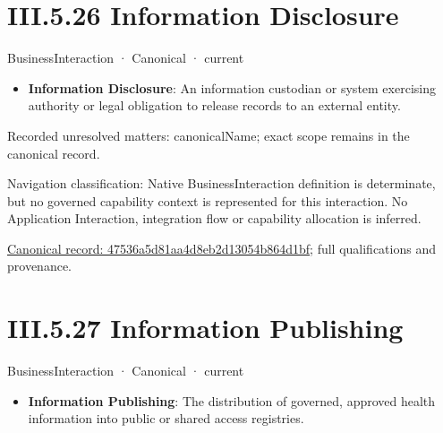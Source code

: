 \section*{III.5.26 Information Disclosure}
\label{navigation:III.5.26}

\label{element:47536a5d81aa4d8eb2d13054b864d1bf}
{\small BusinessInteraction · Canonical · current}\par

\begin{itemize}


\item \textbf{Information Disclosure}: An information custodian or system exercising authority or legal obligation to release records to an external entity.

\end{itemize}

{\small Recorded unresolved matters: canonicalName; exact scope remains in the canonical record.}\par
{\small Navigation classification: Native BusinessInteraction definition is determinate, but no governed capability context is represented for this interaction. No Application Interaction, integration flow or capability allocation is inferred.}\par
{\footnotesize \href{../../../../../../../continuum/business/business-interaction/47536a5d81aa4d8eb2d13054b864d1bf.md}{Canonical record: 47536a5d81aa4d8eb2d13054b864d1bf}; full qualifications and provenance.}\par
\section*{III.5.27 Information Publishing}
\label{navigation:III.5.27}

\label{element:6fb6f66531874c2d983071a04b5934c2}
{\small BusinessInteraction · Canonical · current}\par

\begin{itemize}


\item \textbf{Information Publishing}: The distribution of governed, approved health information into public or shared access registries.

\end{itemize}

